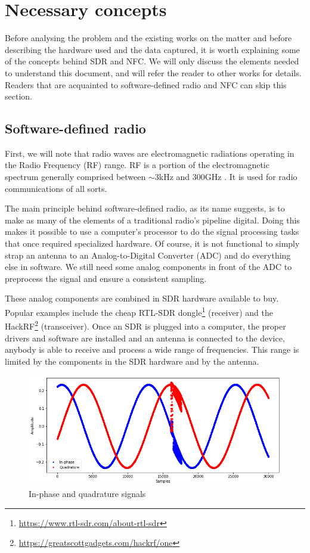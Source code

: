 \section{Necessary concepts}

Before analysing the problem and the existing works on the matter and before describing the hardware used and the data captured, it is worth explaining some of the concepts behind SDR and NFC. We will only discuss the elements needed to understand this document, and will refer the reader to other works for details. Readers that are acquainted to software-defined radio and NFC can skip this section.

\subsection{Software-defined radio}

First, we will note that radio waves are electromagnetic radiations operating in the Radio Frequency (RF) range. RF is a portion of the electromagnetic spectrum generally comprised between $\sim$3kHz and 300GHz \cite{pritchard_elttam}. It is used for radio communications of all sorts.

The main principle behind software-defined radio, as its name suggests, is to make as many of the elements of a traditional radio's pipeline digital. Doing this makes it possible to use a computer's processor to do the signal processing tasks that once required specialized hardware. Of course, it is not functional to simply strap an antenna to an Analog-to-Digital Converter (ADC) and do everything else in software. We still need some analog components in front of the ADC to preprocess the signal and ensure a consistent sampling. \cite{wiki_software-defined_2020, hackaday_your_2015, spiess_286_2019}

These analog components are combined in SDR hardware available to buy. Popular examples include the cheap RTL-SDR dongle\footnote{\url{https://www.rtl-sdr.com/about-rtl-sdr}} (receiver) and the HackRF\footnote{\url{https://greatscottgadgets.com/hackrf/one}} (transceiver). Once an SDR is plugged into a computer, the proper drivers and software are installed and an antenna is connected to the device, anybody is able to receive and process a wide range of frequencies. This range is limited by the components in the SDR hardware and by the antenna.

\begin{figure}[htp!]
  \centering
  \includegraphics[scale=0.55]{figures/concepts_IQ-signal.png}
  \caption{In-phase and quadrature signals}
  \label{fig:iq-signal}
\end{figure}

